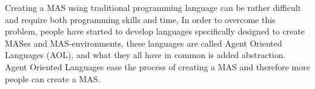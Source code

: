 \indent Creating a MAS using traditional programming language can be rather difficult and require both programming skills and time, In order to overcome this problem, people have started to develop languages specifically designed to create MASes and MAS-environments, these languages are called Agent Oriented Languages (AOL), and what they all have in common is added abstraction. Agent Oriented Languages ease the process of creating a MAS and therefore more people can create a MAS.
